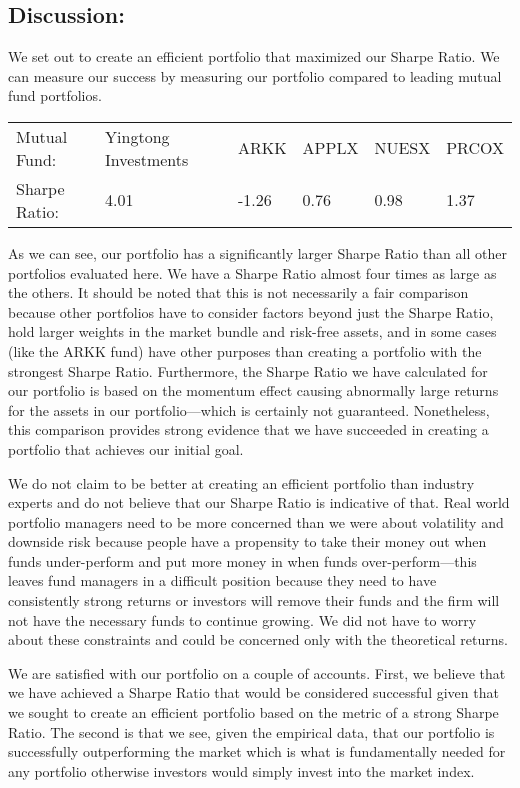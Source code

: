 \documentclass{article}
\begin{document}
\subsection{Discussion:}
We set out to create an efficient portfolio that maximized our Sharpe Ratio. We can measure our success by measuring our portfolio compared to leading mutual fund portfolios.

\begin{table}[H]
\centering
\begin{tabular}{llllll}
Mutual Fund:   & Yingtong Investments & ARKK  & APPLX & NUESX & PRCOX \\
Sharpe Ratio: & 4.01                 & -1.26 & 0.76  & 0.98  & 1.37 
\end{tabular}
\end{table}

As we can see, our portfolio has a significantly larger Sharpe Ratio than all other portfolios evaluated here. We have a Sharpe Ratio almost four times as large as the others. It should be noted that this is not necessarily a fair comparison because other portfolios have to consider factors beyond just the Sharpe Ratio, hold larger weights in the market bundle and risk-free assets, and in some cases (like the ARKK fund) have other purposes than creating a portfolio with the strongest Sharpe Ratio. Furthermore, the Sharpe Ratio we have calculated for our portfolio is based on the momentum effect causing abnormally large returns for the assets in our portfolio—which is certainly not guaranteed. Nonetheless, this comparison provides strong evidence that we have succeeded in creating a portfolio that achieves our initial goal.

We do not claim to be better at creating an efficient portfolio than industry experts and do not believe that our Sharpe Ratio is indicative of that. Real world portfolio managers need to be more concerned than we were about volatility and downside risk because people have a propensity to take their money out when funds under-perform and put more money in when funds over-perform—this leaves fund managers in a difficult position because they need to have consistently strong returns or investors will remove their funds and the firm will not have the necessary funds to continue growing. We did not have to worry about these constraints and could be concerned only with the theoretical returns. 

We are satisfied with our portfolio on a couple of accounts. First, we believe that we have achieved a Sharpe Ratio that would be considered successful given that we sought to create an efficient portfolio based on the metric of a strong Sharpe Ratio. The second is that we see, given the empirical data, that our portfolio is successfully outperforming the market which is what is fundamentally needed for any portfolio otherwise investors would simply invest into the market index.  
\end{document}
